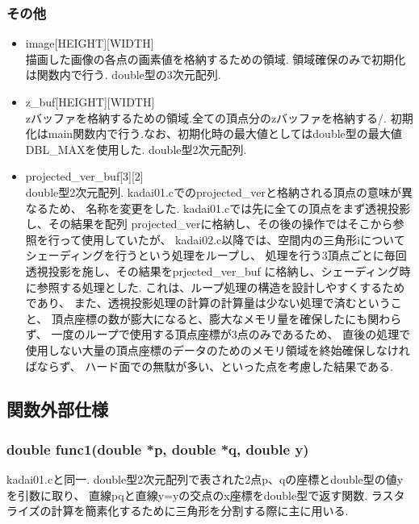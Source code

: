 \documentclass[a4j,dvipdfmx]{jsarticle}
\begin{document}
\subsubsection{その他}
\begin{itemize}
\item image[HEIGHT][WIDTH]\\
  描画した画像の各点の画素値を格納するための領域.
  領域確保のみで初期化は関数内で行う.
  double型の3次元配列.

\item z\_buf[HEIGHT][WIDTH]\\
  zバッファを格納するための領域.全ての頂点分のzバッファを格納する/.
  初期化はmain関数内で行う.なお、初期化時の最大値としてはdouble型の最大値
  DBL\_MAXを使用した.
  double型2次元配列.
  
\item projected\_ver\_buf[3][2]\\
  double型2次元配列.
  kadai01.cでのprojected\_verと格納される頂点の意味が異なるため、
  名称を変更をした.
  kadai01.cでは先に全ての頂点をまず透視投影し、その結果を配列
  projected\_verに格納し、その後の操作ではそこから参照を行って使用していたが、
  kadai02.c以降では、空間内の三角形iについてシェーディングを行うという処理をループし、
  処理を行う3頂点ごとに毎回透視投影を施し、その結果をprjected\_ver\_buf
  に格納し、シェーディング時に参照する処理とした.
  これは、ループ処理の構造を設計しやすくするためであり、
  また、透視投影処理の計算の計算量は少ない処理で済むということ、
  頂点座標の数が膨大になると、膨大なメモリ量を確保したにも関わらず、
  一度のループで使用する頂点座標が3点のみであるため、
  直後の処理で使用しない大量の頂点座標のデータのためのメモリ領域を終始確保しなければならず、
  ハード面での無駄が多い、といった点を考慮した結果である.
\end{itemize}


\subsection{関数外部仕様}
\subsubsection{double func1(double *p, double *q, double y)}
kadai01.cと同一.
double型2次元配列で表された2点p、qの座標とdouble型の値yを引数に取り、
直線pqと直線y=yの交点のx座標をdouble型で返す関数.
ラスタライズの計算を簡素化するために三角形を分割する際に主に用いる.
\end{document}
